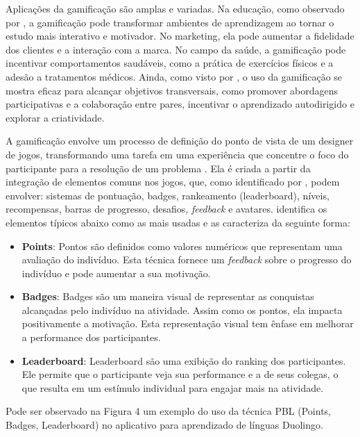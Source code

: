\documentclass[
	12pt,
	openright,
	twoside,
	a4paper,
	english,
	brazil
	]{abntex2}
\begin{document}
Aplicações da gamificação são amplas e variadas. Na educação, como observado por , a gamificação pode transformar ambientes de aprendizagem ao tornar o estudo mais interativo e motivador. No marketing, ela pode aumentar a fidelidade dos clientes e a interação com a marca. No campo da saúde, a gamificação pode incentivar comportamentos saudáveis, como a prática de exercícios físicos e a adesão a tratamentos médicos. Ainda, como visto por , o uso da gamificação se mostra eficaz para alcançar objetivos transversais, como promover abordagens participativas e a colaboração entre pares, incentivar o aprendizado autodirigido e explorar a criatividade.

A gamificação envolve um processo de definição do ponto de vista de um designer de jogos, transformando uma tarefa em uma experiência que concentre o foco do participante para a resolução de um problema \cite{Fardo_2013}. Ela é criada a partir da integração de elementos comuns nos jogos, que, como identificado por , podem envolver: sistemas de pontuação, badges, rankeamento (leaderboard), níveis, recompensas, barras de progresso, desafios, \textit{feedback} e avatares.  identifica os elementos típicos abaixo como as mais usadas e as caracteriza da seguinte forma:
\begin{itemize}
  \item \textbf{Points}: Pontos são definidos como valores numéricos que representam uma avaliação do indivíduo. Esta técnica fornece um \textit{feedback} sobre o progresso do indivíduo e pode aumentar a sua motivação.

  \item \textbf{Badges}: Badges são um maneira visual de representar as conquistas alcançadas pelo indivíduo na atividade. Assim como os pontos, ela impacta positivamente a motivação. Esta representação visual tem ênfase em melhorar a performance dos participantes.

  \item \textbf{Leaderboard}: Leaderboard são uma exibição do ranking dos participantes. Ele permite que o participante veja sua performance e a de seus colegas, o que resulta em um estímulo individual para engajar mais na atividade.
\end{itemize}

Pode ser observado na Figura 4 um exemplo do uso da técnica PBL (Points, Badges, Leaderboard) no aplicativo para aprendizado de línguas Duolingo.
\end{document}
